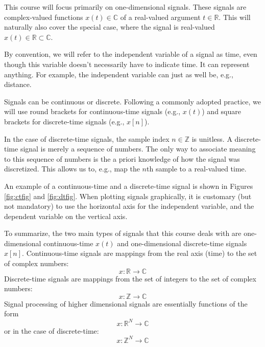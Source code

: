 This course will focus primarily on one-dimensional signals. These signals are 
complex-valued functions $x(t) \in \mathbb{C}$ of a real-valued argument $t\in \mathbb{R}$. 
This will naturally also cover the special case, where the signal is real-valued
$x(t) \in \mathbb{R} \subset\mathbb{C}$.

By convention, we will refer to the independent variable of a signal as time, 
even though this variable doesn't necessarily have to indicate time. 
It can represent anything. For example, the independent variable can 
just as well be, e.g., distance.

Signals can be continuous or discrete. Following a commonly adopted practice, 
we will use round brackets for continuous-time signals (e.g., $x(t)$) 
and square brackets for discrete-time signals (e.g., $x[n]$).

In the case of discrete-time signals, the sample index
$n \in \mathbb{Z}$ is unitless. A discrete-time signal is merely a sequence of numbers. 
The only way to associate meaning to this sequence of numbers is the a priori 
knowledge of how the signal was discretized. This allows us to, e.g., map the $n$th sample to a real-valued time.

An example of a continuous-time and a discrete-time signal is shown in 
Figures \ref{fig:ctfig} and \ref{fig:dtfig}. When plotting signals graphically, 
it is customary (but not mandatory) to use the horizontal axis for the independent 
variable, and the dependent variable on the vertical axis.

To summarize, the two main types of signals that this course deals with are one-dimensional 
continuous-time $x(t)$ and one-dimensional discrete-time signals $x[n]$. 
Continuous-time signals are mappings from the real axis (time) to the set of complex numbers:
\begin{equation}
   \boxed{
      x: \mathbb{R} \rightarrow \mathbb{C}
   }
\end{equation}
Discrete-time signals are mappings from the set of integers to the set of complex numbers:
\begin{equation}
   \boxed{
      x: \mathbb{Z} \rightarrow \mathbb{C}
   }
\end{equation}
Signal processing of higher dimensional signals are essentially functions of the form
\begin{equation}
   x: \mathbb{R}^N \rightarrow \mathbb{C}
\end{equation}
or in the case of discrete-time:
\begin{equation}
   x: \mathbb{Z}^N \rightarrow \mathbb{C}
\end{equation}

